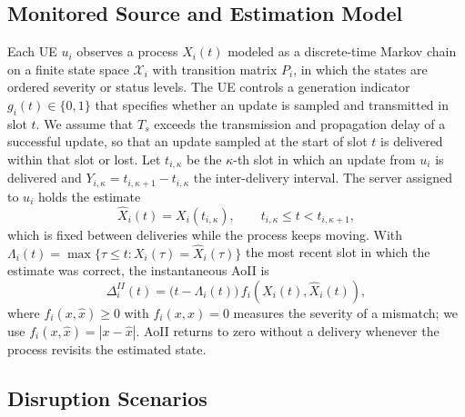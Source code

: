 \subsection{Monitored Source and Estimation Model}
\label{sec:source}

Each UE $u_i$ observes a process $X_i(t)$ modeled as a discrete-time Markov chain on a finite state space
$\mathcal{X}_i$ with transition matrix $P_i$, in which the states are ordered severity or status levels. The UE
controls a generation indicator $g_i(t)\in\{0,1\}$ that specifies whether an update is sampled and transmitted in
slot $t$. We assume that $T_s$ exceeds the transmission and propagation delay of a successful update, so that an update
sampled at the start of slot $t$ is delivered within that slot or lost. Let $t_{i,\kappa}$ be the $\kappa$-th slot in
which an update from $u_i$ is delivered and $Y_{i,\kappa}=t_{i,\kappa+1}-t_{i,\kappa}$ the inter-delivery interval.
The server assigned to $u_i$ holds the estimate
\begin{equation}
    \hat{X}_i(t)=X_i(t_{i,\kappa}),\qquad t_{i,\kappa}\leq t<t_{i,\kappa+1},
\end{equation}
which is fixed between deliveries while the process keeps moving. With $\Lambda_i(t)=\max\{\tau\leq t:
X_i(\tau)=\hat{X}_i(\tau)\}$ the most recent slot in which the estimate was correct, the instantaneous AoII
is~\cite{Maatouk2020}
\begin{equation}
    \Delta_i^{II}(t)=\bigl(t-\Lambda_i(t)\bigr)\,f_i\!\left(X_i(t),\hat{X}_i(t)\right),
    \label{eq:aoii_def}
\end{equation}
where $f_i(x,\hat{x})\geq 0$ with $f_i(x,x)=0$ measures the severity of a mismatch; we use $f_i(x,\hat{x})=|x-\hat{x}|$.
AoII returns to zero without a delivery whenever the process revisits the estimated state.

\subsection{Disruption Scenarios}
\label{sec:scenarios}


